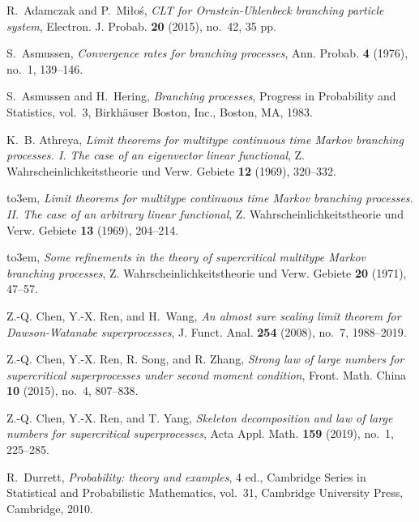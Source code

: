 \documentclass[12pt,a4paper]{amsart}
\theoremstyle{plain}
\theoremstyle{definition}
\numberwithin{equation}{section}
\begin{document}
\providecommand{\bysame}{\leavevmode\hbox to3em{\hrulefill}\thinspace}
\begin{thebibliography}{10}

R.~Adamczak and P.~Mi{\l}o\'{s}, \emph{C{LT} for {O}rnstein-{U}hlenbeck branching particle system},
  Electron. J. Probab. \textbf{20} (2015), no.~42, 35 pp.

  S.~Asmussen, \emph{Convergence rates for branching processes}, Ann.
  Probab.  \textbf{4} (1976), no.~1, 139--146.

S.~Asmussen and H.~Hering, \emph{Branching processes}, Progress in Probability
  and Statistics, vol.~3, Birkh\"{a}user Boston, Inc., Boston, MA, 1983.

K.~B. Athreya, \emph{Limit theorems for multitype continuous time {M}arkov
  branching processes. {I}. {T}he case of an eigenvector linear functional}, Z.
  Wahrscheinlichkeitstheorie und Verw. Gebiete \textbf{12} (1969), 320--332.

\bysame, \emph{Limit theorems for multitype continuous time {M}arkov branching
  processes. {II}. {T}he case of an arbitrary linear functional}, Z.
  Wahrscheinlichkeitstheorie und Verw. Gebiete \textbf{13} (1969), 204--214.

\bysame, \emph{Some refinements in the theory of supercritical multitype
  {M}arkov branching processes}, Z. Wahrscheinlichkeitstheorie und Verw.
  Gebiete \textbf{20} (1971), 47--57.


Z.-Q. Chen, Y.-X. Ren, and H.~Wang, \emph{An almost sure scaling limit theorem
  for {D}awson-{W}atanabe superprocesses}, J. Funct. Anal. \textbf{254} (2008),
  no.~7, 1988--2019.

  Z.-Q. Chen, Y.-X. Ren, R. Song, and R. Zhang,
 \emph{Strong law of large numbers for supercritical superprocesses under second moment condition}, Front. Math. China \textbf{10} (2015), no.~4, 807--838.


  Z.-Q. Chen, Y.-X. Ren,  and T. Yang,
 \emph{Skeleton decomposition and law of large numbers for supercritical superprocesses}, Acta Appl. Math. \textbf{159} (2019), no.~1, 225--285.

R.~Durrett, \emph{Probability: theory and examples}, 4 ed., Cambridge Series in
  Statistical and Probabilistic Mathematics, vol.~31, Cambridge University
  Press, Cambridge, 2010.


\end{thebibliography}
\end{document}
